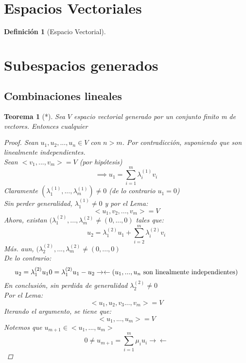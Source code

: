 \documentclass[11pt]{book}
\newtheorem{thm}{Teorema}[section]
\theoremstyle{definition}
\newtheorem{defn}{Definición}[section]
\begin{document}
\section{Espacios Vectoriales}
\begin{defn}[Espacio Vectorial]
	
\end{defn}
\section{Subespacios generados}
\subsection{Combinaciones lineales}
\begin{thm}[*]
	Sea $V$ espacio vectorial generado por un conjunto finito m de vectores. Entonces cualquier

	\begin{proof}
		Sean $u_1,u_2,...,u_n\in V$ con $n>m$. Por contradicción, suponiendo que son linealmente independientes.\\
		Sean $<v_1,...,v_m>=V$ (por hipótesis)
		\[
		\implies u_1=\sum^m_{i=1}\lambda_i^{(1)} v_i
		\]
		Claramente $(\lambda_1^{(1)},...,\lambda_m^{(1)})\neq 0$ (de lo contrario $u_1=0$)\\
		Sin perder generalidad, $\lambda_1^{(1)}\neq 0$ y por el Lema:
		\[
		<u_1,v_2,...,v_m>=V
		\]
		Ahora, existan $(\lambda_1^{(2)},...,\lambda_m^{(2)}\neq(0,...,0)$ tales que:
		\[
		u_2=\lambda_1^{(2)} u_1+\sum^m_{i=2}\lambda_i^{(2)}v_i
		\]
		Más. aun, $(\lambda_2^{(2)},...,\lambda_m^{(2)}\neq(0,...,0)$\\
		De lo contrario:
		\[
		u_2=\lambda_1^{(2)}u_1\\
		0=\lambda_1^{(2)}u_1-u_2\\
		\rightarrow\leftarrow (u_1,...,u_n\textrm{ son linealmente independientes})
		\]
		En conclusión, sin perdida de generalidad  $\lambda_2^{(2)}\neq 0$\\
		Por el Lema:
		\[
		<u_1,u_2,v_3...,v_m>=V
		\]
		Iterando el argumento, se tiene que:
		\[
		<u_1,...,u_m>=V
		\]
		Notemos que $u_{m+1}\in<u_1,...,u_m>$
		\[
		0\neq u_{m+1}=\sum^m_{i=1}\mu_i u_i
		\rightarrow\leftarrow
		\]		
	\end{proof}
\end{thm}
\end{document}
